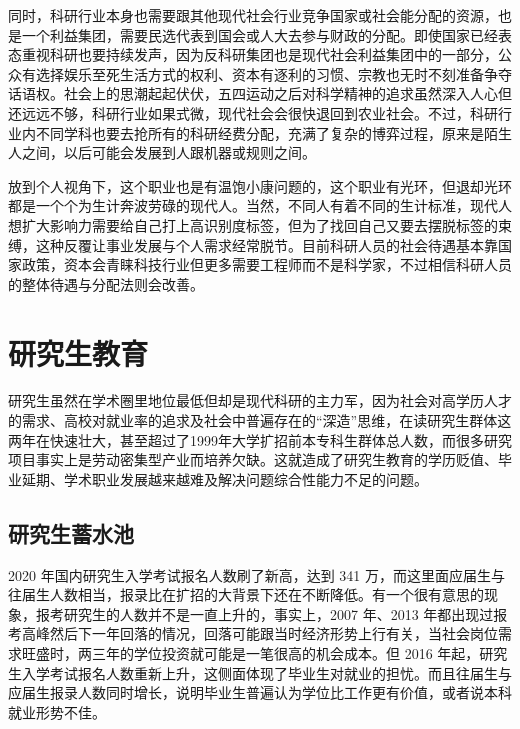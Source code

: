 \documentclass[]{tufte-book}
\begin{document}
同时，科研行业本身也需要跟其他现代社会行业竞争国家或社会能分配的资源，也是一个利益集团，需要民选代表到国会或人大去参与财政的分配。即使国家已经表态重视科研也要持续发声，因为反科研集团也是现代社会利益集团中的一部分，公众有选择娱乐至死生活方式的权利、资本有逐利的习惯、宗教也无时不刻准备争夺话语权。社会上的思潮起起伏伏，五四运动之后对科学精神的追求虽然深入人心但还远远不够，科研行业如果式微，现代社会会很快退回到农业社会。不过，科研行业内不同学科也要去抢所有的科研经费分配，充满了复杂的博弈过程，原来是陌生人之间，以后可能会发展到人跟机器或规则之间。

放到个人视角下，这个职业也是有温饱小康问题的，这个职业有光环，但退却光环都是一个个为生计奔波劳碌的现代人。当然，不同人有着不同的生计标准，现代人想扩大影响力需要给自己打上高识别度标签，但为了找回自己又要去摆脱标签的束缚，这种反覆让事业发展与个人需求经常脱节。目前科研人员的社会待遇基本靠国家政策，资本会青睐科技行业但更多需要工程师而不是科学家，不过相信科研人员的整体待遇与分配法则会改善。

\hypertarget{ux7814ux7a76ux751fux6559ux80b2}{%
\section{研究生教育}\label{ux7814ux7a76ux751fux6559ux80b2}}

研究生虽然在学术圈里地位最低但却是现代科研的主力军，因为社会对高学历人才的需求、高校对就业率的追求及社会中普遍存在的``深造''思维，在读研究生群体这两年在快速壮大，甚至超过了1999年大学扩招前本专科生群体总人数，而很多研究项目事实上是劳动密集型产业而培养欠缺。这就造成了研究生教育的学历贬值、毕业延期、学术职业发展越来越难及解决问题综合性能力不足的问题。

\hypertarget{ux7814ux7a76ux751fux84c4ux6c34ux6c60}{%
\subsection{研究生蓄水池}\label{ux7814ux7a76ux751fux84c4ux6c34ux6c60}}

2020 年国内研究生入学考试报名人数刷了新高，达到 341 万，而这里面应届生与往届生人数相当，报录比在扩招的大背景下还在不断降低。有一个很有意思的现象，报考研究生的人数并不是一直上升的，事实上，2007 年、2013 年都出现过报考高峰然后下一年回落的情况，回落可能跟当时经济形势上行有关，当社会岗位需求旺盛时，两三年的学位投资就可能是一笔很高的机会成本。但 2016 年起，研究生入学考试报名人数重新上升，这侧面体现了毕业生对就业的担忧。而且往届生与应届生报录人数同时增长，说明毕业生普遍认为学位比工作更有价值，或者说本科就业形势不佳。
\end{document}
